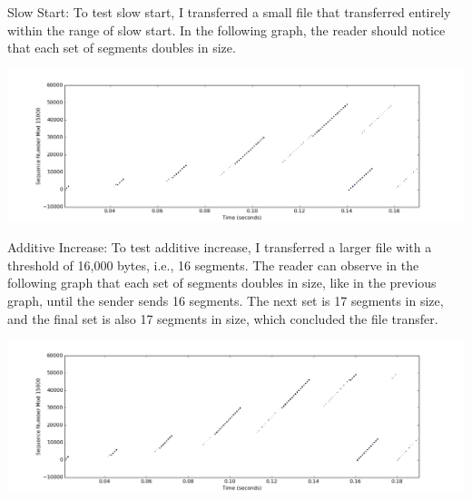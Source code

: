 \documentclass[11pt]{article}
\begin{document}
Slow Start: To test slow start, I transferred a small file that transferred entirely within the range of slow start. In the following graph, the reader should notice that each set of segments doubles in size. 

\includegraphics[width=17cm]{outputs/converted_output1.png}

Additive Increase: To test additive increase, I transferred a larger file with a threshold of 16,000 bytes, i.e., 16 segments.  The reader can observe in the following graph that each set of segments doubles in size, like in the previous graph, until the sender sends 16 segments. The next set is 17 segments in size, and the final set is also 17 segments in size, which concluded the file transfer.

\includegraphics[width=17cm]{outputs/converted_output2.png}
\end{document}
